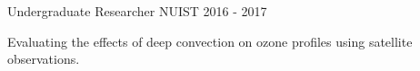 \begin{cventries}
  \cventry
    {Undergraduate Researcher} %
    {NUIST} %
    {2016 - 2017} %
    {}%
    {
      \begin{cvitems} %
        \item {Evaluating the effects of deep convection on ozone profiles using satellite observations.}
      \end{cvitems}
    }


\end{cventries}
